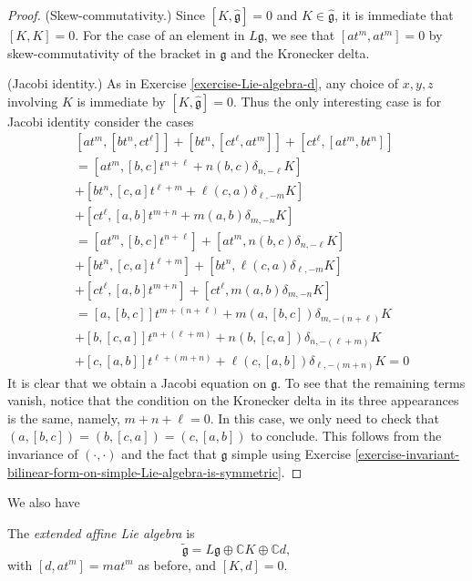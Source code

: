 \begin{proof}
(Skew-commutativity.) 
Since $[K,\hat{\mathfrak{g}}]=0$ and $K \in \hat{\mathfrak{g}}$, 
it is immediate that $[K,K]=0$. 
For the case of an element in $L\mathfrak{g}$, we see that
$[at^m,at^m]=0$ by skew-commutativity of the bracket in $\mathfrak{g}$ 
and the Kronecker delta.
 
(Jacobi identity.) As in Exercise \ref{exercise-Lie-algebra-d}, 
any choice of $x,y,z$ involving $K$ is immediate by $[K,\hat{\mathfrak{g}}]=0$.
Thus the only interesting case is
for Jacobi identity consider the cases
\begin{align*}
& [at^m,[bt^n,ct^\ell]]+[bt^n,[ct^\ell,at^m]]+[ct^\ell,[at^m,bt^n]]\\
&=[at^m,[b,c]t^{n+\ell}+n(b,c)\delta_{n,-\ell}K]\\
&+[bt^n,[c,a]t^{\ell+m}+\ell(c,a)\delta_{\ell,-m}K]\\
&+[ct^\ell,[a,b]t^{m+n}+m(a,b)\delta_{m,-n}K]\\
&=[at^m,[b,c]t^{n+\ell}]+[at^m,n(b,c)\delta_{n,-\ell}K]\\
&+[bt^n,[c,a]t^{\ell+m}]+[bt^n,\ell(c,a)\delta_{\ell,-m}K]\\
&+[ct^\ell,[a,b]t^{m+n}]+[ct^\ell,m(a,b)\delta_{m,-n}K]\\
&=[a,[b,c]]t^{m+(n+\ell)}+m(a,[b,c])\delta_{m,-(n+\ell)}K\\
&+[b,[c,a]]t^{n+(\ell+m)}+n(b,[c,a])\delta_{n,-(\ell+m)}K\\
&+[c,[a,b]]t^{\ell+(m+n)}+\ell(c,[a,b])\delta_{\ell,-(m+n)}K=0
\end{align*}
It is clear that we obtain a Jacobi equation on $\mathfrak{g}$. To see that the
remaining terms vanish, notice that the condition on
the Kronecker delta in its three appearances is the same,
namely, $m+n+\ell=0$. In this case, we only need to check
that $(a,[b,c])=(b,[c,a])=(c,[a,b])$ to conclude.
This follows from the invariance of $(\cdot,\cdot)$
and the fact that $\mathfrak{g}$ simple using Exercise 
\ref{exercise-invariant-bilinear-form-on-simple-Lie-algebra-is-symmetric}.
\end{proof}

We also have
\begin{definition}
\label{definition-extended-affine-Lie-algebra}
The {\it extended affine Lie algebra} is 
$$
\tilde{\mathfrak{g}}=L\mathfrak{g} \oplus \mathbb{C}K \oplus \mathbb{C}d,
$$ 
with $[d,at^m]=m a t^m$ as before, and 
$[K,d]=0$.
\end{definition}

